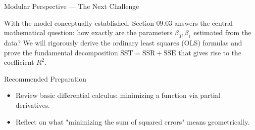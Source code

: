 \documentclass[10pt, aspectratio=169]{beamer}
\begin{document}
\begin{frame}{Modular Perspective --- The Next Challenge}
  \scriptsize
  \begin{retoclase}
    With the model conceptually established, Section 09.03 answers the central mathematical question: how exactly are the parameters $\beta_0,\beta_1$ estimated from the data? We will rigorously derive the ordinary least squares (OLS) formulas and prove the fundamental decomposition $\text{SST}=\text{SSR}+\text{SSE}$ that gives rise to the coefficient $R^2$.
  \end{retoclase}

  \vspace{0.08cm}
  \pause
  \begin{alertblock}{Recommended Preparation}
    \begin{itemize}\itemsep=0.06cm
      \item Review basic differential calculus: minimizing a function via partial derivatives.
      \item Reflect on what "minimizing the sum of squared errors" means geometrically.
    \end{itemize}
  \end{alertblock}
\end{frame}
\end{document}
